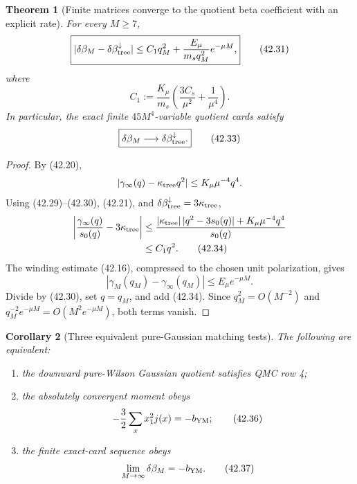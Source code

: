 \documentclass[11pt,oneside]{book}
\newtheorem{theorem}{Theorem}[chapter]
\newtheorem{corollary}[theorem]{Corollary}
\theoremstyle{definition}
\theoremstyle{remark}
\begin{document}
\begin{theorem}[Finite matrices converge to the quotient beta
coefficient with an explicit rate]
\label{thm:e8v42-cofinal-estimator}
For every \(M\ge7\),
\[
 \boxed{
 |\delta\beta_M-\delta\beta_{\rm tree}^{\downarrow}|
 \le C_1q_M^2+
 \frac{E_\mu}{m_sq_M^2}e^{-\mu M},}                            \tag{42.31}
\]
where
\[
 C_1:=\frac{K_\mu}{m_s}
 \left(\frac{3C_s}{\mu^2}+\frac1{\mu^4}\right).                \tag{42.32}
\]
In particular, the exact finite \(45M^4\)-variable quotient cards
satisfy
\[
 \boxed{\delta\beta_M\longrightarrow
 \delta\beta_{\rm tree}^{\downarrow}.}                         \tag{42.33}
\]
\end{theorem}

\begin{proof}
By (42.20),
\[
 |\gamma_\infty(q)-\kappa_{\rm tree}q^2|
 \le K_\mu\mu^{-4}q^4.
\]
Using (42.29)--(42.30), (42.21), and
\(\delta\beta_{\rm tree}^{\downarrow}=3\kappa_{\rm tree}\),
\[
 \begin{split}
 \left|\frac{\gamma_\infty(q)}{s_0(q)}
       -3\kappa_{\rm tree}\right|
 &\le
 \frac{|\kappa_{\rm tree}|\,|q^2-3s_0(q)|
       +K_\mu\mu^{-4}q^4}{s_0(q)}\\
 &\le C_1q^2.                                                   \tag{42.34}
 \end{split}
\]
The winding estimate (42.16), compressed to the chosen unit
polarization, gives
\[
 |\gamma_M(q_M)-\gamma_\infty(q_M)|
 \le E_\mu e^{-\mu M}.                                         \tag{42.35}
\]
Divide by (42.30), set \(q=q_M\), and add (42.34).  Since
\(q_M^2=O(M^{-2})\) and \(q_M^{-2}e^{-\mu M}=O(M^2e^{-\mu M})\),
both terms vanish.
\end{proof}

\begin{corollary}[Three equivalent pure-Gaussian matching tests]
\label{cor:e8v42-three-tests}
The following are equivalent:
\begin{enumerate}
\item the downward pure-Wilson Gaussian quotient satisfies QMC row 4;
\item the absolutely convergent moment obeys
      \[
       -\frac32\sum_xx_1^2j(x)=-b_{\rm YM};                    \tag{42.36}
      \]
\item the finite exact-card sequence obeys
      \[
       \lim_{M\to\infty}\delta\beta_M=-b_{\rm YM}.              \tag{42.37}
      \]
\end{enumerate}
\end{corollary}
\end{document}
